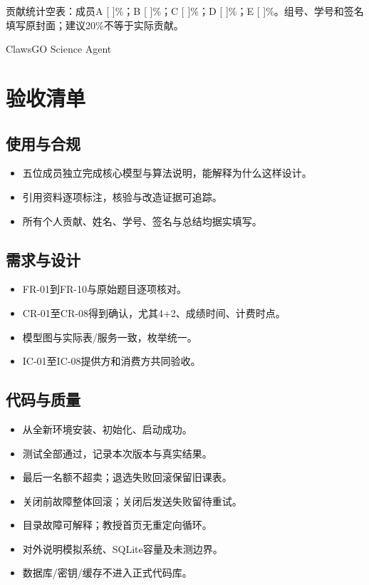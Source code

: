 \documentclass[UTF8,11pt,a4paper]{ctexart}
\providecommand{\tightlist}{\setlength{\itemsep}{0pt}\setlength{\parskip}{0pt}}
\begin{document}
贡献统计空表：成员A {[} {]}\%；B {[} {]}\%；C {[} {]}\%；D {[} {]}\%；E
{[} {]}\%。组号、学号和签名填写原封面；建议20\%不等于实际贡献。

ClawsGO Science Agent

\clearpage
\hypertarget{ux9a8cux6536ux6e05ux5355}{%
\section{验收清单}\label{ux9a8cux6536ux6e05ux5355}}

\hypertarget{ux4f7fux7528ux4e0eux5408ux89c4}{%
\subsection{使用与合规}\label{ux4f7fux7528ux4e0eux5408ux89c4}}

\begin{itemize}
\tightlist
\item[$\square$]
  五位成员独立完成核心模型与算法说明，能解释为什么这样设计。
\item[$\square$]
  引用资料逐项标注，核验与改造证据可追踪。
\item[$\square$]
  所有个人贡献、姓名、学号、签名与总结均据实填写。
\end{itemize}

\hypertarget{ux9700ux6c42ux4e0eux8bbeux8ba1}{%
\subsection{需求与设计}\label{ux9700ux6c42ux4e0eux8bbeux8ba1}}

\begin{itemize}
\tightlist
\item[$\square$]
  FR-01到FR-10与原始题目逐项核对。
\item[$\square$]
  CR-01至CR-08得到确认，尤其4+2、成绩时间、计费时点。
\item[$\square$]
  模型图与实际表/服务一致，枚举统一。
\item[$\square$]
  IC-01至IC-08提供方和消费方共同验收。
\end{itemize}

\hypertarget{ux4ee3ux7801ux4e0eux8d28ux91cf}{%
\subsection{代码与质量}\label{ux4ee3ux7801ux4e0eux8d28ux91cf}}

\begin{itemize}
\tightlist
\item[$\square$]
  从全新环境安装、初始化、启动成功。
\item[$\square$]
  测试全部通过，记录本次版本与真实结果。
\item[$\square$]
  最后一名额不超卖；退选失败回滚保留旧课表。
\item[$\square$]
  关闭前故障整体回滚；关闭后发送失败留待重试。
\item[$\square$]
  目录故障可解释；教授首页无重定向循环。
\item[$\square$]
  对外说明模拟系统、SQLite容量及未测边界。
\item[$\square$]
  数据库/密钥/缓存不进入正式代码库。
\end{itemize}
\end{document}
